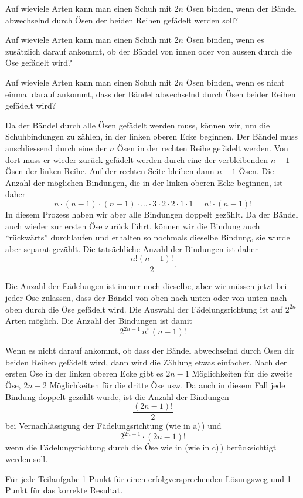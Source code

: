 \begin{teilaufgaben}
\item
Auf wieviele Arten kann man einen Schuh mit $2n$ Ösen binden, wenn der
Bändel abwechselnd durch Ösen der beiden Reihen gefädelt werden soll?
\item
Auf wieviele Arten kann man einen Schuh mit $2n$ Ösen binden, wenn
es zusätzlich darauf ankommt, ob der Bändel von innen oder von aussen
durch die Öse gefädelt wird?
\item
Auf wieviele Arten kann man einen Schuh mit $2n$ Ösen binden,
wenn es nicht einmal darauf ankommt, dass der Bändel abwechselnd
durch Ösen beider Reihen gefädelt wird?
\end{teilaufgaben}


\begin{loesung}
\begin{teilaufgaben}
\item
Da der Bändel durch alle Ösen gefädelt werden muss, können wir, um die
Schuhbindungen zu zählen, in der linken oberen Ecke beginnen.
Der Bändel muss anschliessend durch eine der $n$ Ösen in der rechten
Reihe gefädelt werden.
Von dort muss er wieder zurück gefädelt werden durch eine der
verbleibenden $n-1$ Ösen der linken Reihe.
Auf der rechten Seite bleiben dann $n-1$ Ösen.
Die Anzahl der möglichen Bindungen, die in der linken oberen Ecke beginnen,
ist daher
\[
n\cdot (n-1) \cdot (n-1) \cdot \dots \cdot 3\cdot 2 \cdot 2 \cdot 1 \cdot 1
=
n! \cdot (n-1)!
\]
In diesem Prozess haben wir aber alle Bindungen doppelt gezählt.
Da der Bändel auch wieder zur ersten Öse zurück führt, können wir die
Bindung auch ``rückwärts'' durchlaufen und erhalten so nochmals dieselbe
Bindung, sie wurde aber separat gezählt.
Die tatsächliche Anzahl der Bindungen ist daher
\[
\frac{n!(n-1)!}2.
\]
\item 
Die Anzahl der Fädelungen ist immer noch dieselbe, aber wir müssen
jetzt bei jeder Öse zulassen, dass der Bändel von oben nach unten
oder von unten nach oben durch die Öse gefädelt wird.
Die Auswahl der Fädelungsrichtung ist auf $2^{2n}$ Arten möglich.
Die Anzahl der Bindungen ist damit
\[
2^{2n-1}\, n!\, (n-1)!
\]
\item
Wenn es nicht darauf ankommt, ob dass der Bändel abwechselnd durch
Ösen dir beiden Reihen gefädelt wird, dann wird die Zählung etwas
einfacher.
Nach der ersten Öse in der linken oberen Ecke gibt es $2n-1$ Möglichkeiten
für die zweite Öse, $2n-2$ Möglichkeiten für die dritte Öse usw.
Da auch in diesem Fall jede Bindung doppelt gezählt wurde, ist
die Anzahl der Bindungen
\[
\frac{(2n-1)!}{2}
\] 
bei Vernachlässigung der Fädelungsrichtung (wie in a)\,) und
\[
2^{2n-1} \cdot (2n-1)!
\]
wenn die Fädelungsrichtung durch die Öse wie in (wie in c)\,)
berücksichtigt werden soll.
\qedhere
\end{teilaufgaben}
\end{loesung}

\begin{bewertung}
Für jede Teilaufgabe 1 Punkt für einen erfolgversprechenden Lösungsweg
und 1 Punkt für das korrekte Resultat.
\end{bewertung}
